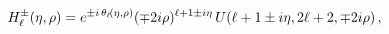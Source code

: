 \[\mathop{{H^{\pm}_{\ell}}\/}\nolimits\!\left(\eta,\rho\right)=e^{\pm i\mathop{{%
\theta_{\ell}}\/}\nolimits\!\left(\eta,\rho\right)}(\mp 2i\rho)^{\ell+1\pm i%
\eta}\mathop{U\/}\nolimits\!\left(\ell+1\pm i\eta,2\ell+2,\mp 2i\rho\right),\]